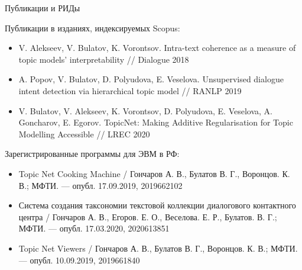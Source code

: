 \begin{frame}[t]{Публикации и РИДы}
\footnotesize

Публикации в изданиях, индексируемых Scopus:
\begin{itemize}
    \smallskip\item  V. Alekseev, V. Bulatov, K. Vorontsov. Intra-text coherence as a measure of topic models’ interpretability  // Dialogue 2018

    \smallskip\item A. Popov, V. Bulatov, D. Polyudova, E. Veselova. Unsupervised dialogue intent detection via hierarchical topic model // RANLP 2019

    \smallskip\item V. Bulatov, V. Alekseev, K. Vorontsov, D. Polyudova, E. Veselova, A. Goncharov, E. Egorov. TopicNet: Making Additive Regularisation for Topic Modelling Accessible // LREC 2020

\end{itemize}

Зарегистрированные программы для ЭВМ в РФ:
\begin{itemize}
    \smallskip\item  Topic Net Cooking Machine  / Гончаров А. В., Булатов В. Г., Воронцов. К. В.; МФТИ. --- опубл. 17.09.2019, 2019662102

    \smallskip\item Система создания таксономии текстовой коллекции диалогового контактного центра / Гончаров А. В., Егоров. Е. О., Веселова. Е. Р., Булатов. В. Г.; МФТИ. --- опубл. 17.03.2020, 2020613851

    \smallskip\item Topic Net Viewers  / Гончаров А. В., Булатов В. Г., Воронцов. К. В.; МФТИ. --- опубл. 10.09.2019, 2019661840

\end{itemize}

\normalsize
\end{frame}
